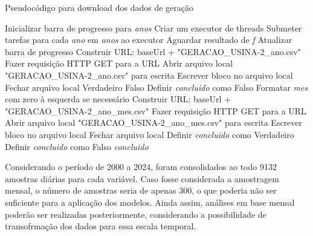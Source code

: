 \begin{algorithm}
\caption{Pseudocódigo para download dos dados de geração}
\label{alg:get_geracao_pseudo}
\begin{algorithmic}[1]
    \State Inicializar barra de progresso para \textit{anos}
    \State Criar um executor de threads
    \State Submeter tarefas  para cada \textit{ano} em \textit{anos} ao executor
      \State Aguardar resultado de \textit{f}
      \State Atualizar barra de progresso
    \EndFor
  \EndFunction
  \State
      \State Construir URL: baseUrl + "GERACAO\_USINA-2\_{ano}.csv"
      \State Fazer requisição HTTP GET para a URL
        \State Abrir arquivo local "GERACAO\_USINA-2\_{ano}.csv" para escrita
          \State Escrever bloco no arquivo local
        \EndFor
        \State Fechar arquivo local
        \State \Return Verdadeiro
      \Else
        \State \Return Falso
      \EndIf
    \Else
      \State Definir \textit{concluido} como Falso
        \State Formatar \textit{mes} com zero à esquerda se necessário
        \State Construir URL: baseUrl + "GERACAO\_USINA-2\_{ano}\_{mes}.csv"
        \State Fazer requisição HTTP GET para a URL
          \State Abrir arquivo local "GERACAO\_USINA-2\_{ano}\_{mes}.csv" para escrita
            \State Escrever bloco no arquivo local
          \EndFor
          \State Fechar arquivo local
          \State Definir \textit{concluido} como Verdadeiro
        \Else
          \State Definir \textit{concluido} como Falso
        \EndIf
      \EndFor
      \State \Return \textit{concluido}
    \EndIf
  \EndFunction

\end{algorithmic}
\end{algorithm}


Considerando o período de 2000 a 2024, foram consolidados ao todo 9132 amostras diárias para cada variável. Caso fosse
considerada a amostragem mensal, o número de amostras seria de apenas 300, o que poderia não ser suficiente para
a aplicação dos modelos. Ainda assim, análises em base mensal poderão ser realizadas posteriormente, considerando a
possibilidade de transofrmação dos dados para essa escala temporal.

